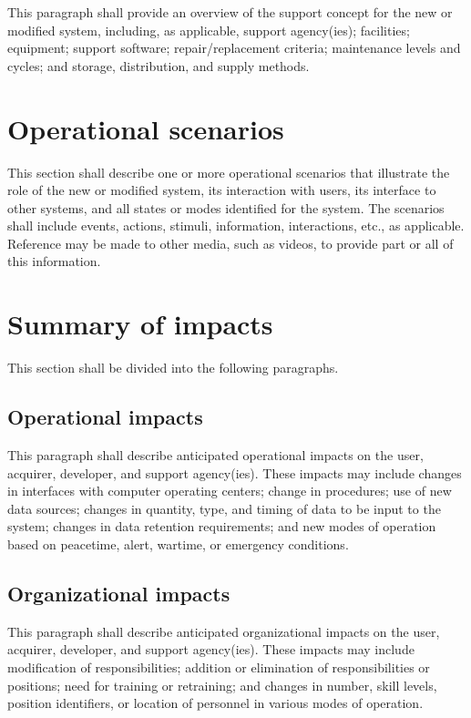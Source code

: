 This paragraph shall provide an overview of the support concept for the
new or modified system, including, as applicable, support agency(ies);
facilities; equipment; support software; repair/replacement criteria;
maintenance levels and cycles; and storage, distribution, and supply
methods.

\section{Operational scenarios}

This section shall describe one or more operational scenarios that
illustrate the role of the new or modified system, its interaction with
users, its interface to other systems, and all states or modes
identified for the system. The scenarios shall include events, actions,
stimuli, information, interactions, etc., as applicable. Reference may
be made to other media, such as videos, to provide part or all of this
information.

\section{Summary of impacts}

This section shall be divided into the following paragraphs.

\subsection{Operational impacts}

This paragraph shall describe anticipated operational impacts on the
user, acquirer, developer, and support agency(ies). These impacts may
include changes in interfaces with computer operating centers; change in
procedures; use of new data sources; changes in quantity, type, and
timing of data to be input to the system; changes in data retention
requirements; and new modes of operation based on peacetime, alert,
wartime, or emergency conditions.

\subsection{Organizational impacts}

This paragraph shall describe anticipated organizational impacts on the
user, acquirer, developer, and support agency(ies). These impacts may
include modification of responsibilities; addition or elimination of
responsibilities or positions; need for training or retraining; and
changes in number, skill levels, position identifiers, or location of
personnel in various modes of operation.

